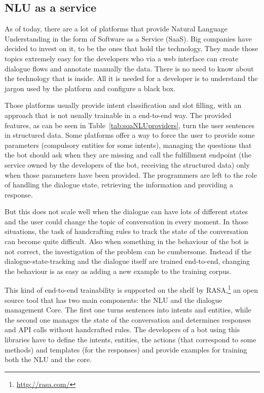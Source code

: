 \subsection{NLU as a service}
As of today, there are a lot of platforms that provide Natural Language Understanding in the form of Software as a Service (SaaS). Big companies have decided to invest on it, to be the ones that hold the technology. They made those topics extremely easy for the developers who via a web interface can create dialogue flows and annotate manually the data. There is no need to know about the technology that is inside. All it is needed for a developer is to understand the jargon used by the platform and configure a black box.




Those platforms usually provide intent classification and slot filling, with an approach that is not usually trainable in a end-to-end way. The provided features, as can be seen in Table~\ref{tab:soaNLUproviders}, turn the user sentences in structured data. Some platforms offer a way to force the user to provide some parameters (compulsory entities for some intents), managing the questions that the bot should ask when they are missing and call the fulfillment endpoint (the service owned by the developers of the bot, receiving the structured data) only when those parameters have been provided. The programmers are left to the role of handling the dialogue state, retrieving the information and providing a response.

But this does not scale well when the dialogue can have lots of different states and the user could change the topic of conversation in every moment. In those situations, the task of handcrafting rules to track the state of the conversation can become quite difficult. Also when something in the behaviour of the bot is not correct, the investigation of the problem can be cumbersome. Instead if the dialogue-state-tracking and the dialogue itself are trained end-to-end, changing the behaviour is as easy as adding a new example to the training corpus.

This kind of end-to-end trainability is supported on the shelf by RASA,\footnote{\url{http://rasa.com/}} an open source tool that has two main components: the NLU and the dialogue management Core. The first one turns sentences into intents and entities, while the second one manages the state of the conversation and determines responses and API calls without handcrafted rules. The developers of a bot using this libraries have to define the intents, entities, the actions (that correspond to some methods) and templates (for the responses) and provide examples for training both the NLU and the core.

